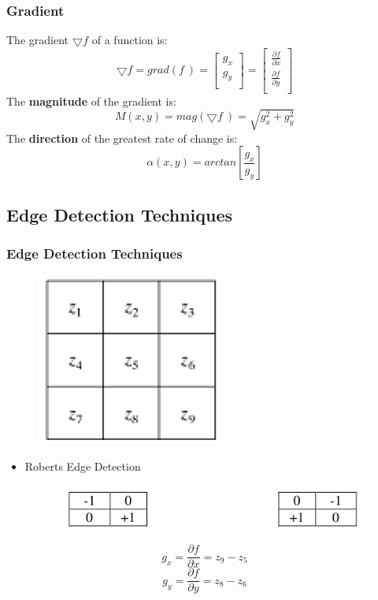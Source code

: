\documentclass[notheorems,serif,table,compress]{beamer}  %
\begin{document}
\begin{frame}
\frametitle{Gradient}
The gradient $\bigtriangledown f$ of a function is: 
    \begin{displaymath}
        \bigtriangledown f = grad(f ~) = \left[\begin{array}{c}
    		          g_{x}  \\
    		          g_{y}  \\
    		         \end{array}\right]
        =\left[ \begin{array}{c}
    		          \frac{\partial f}{\partial x}  \\
    		          \frac{\partial f}{\partial y}  \\
    		         \end{array} \right]
    \end{displaymath}
The {\textbf{magnitude}} of the gradient is:
    \begin{displaymath}
        M(x,y)=mag(\bigtriangledown f ~) = \sqrt{g_{x}^{2}+g_{y}^{2}}
    \end{displaymath}
The {\textbf{direction}} of the greatest rate of change is:
    \begin{displaymath}
        \alpha (x,y)=arctan \left[ \frac{g_{x}}{g_{y}} \right]
    \end{displaymath}
\end{frame}


\subsection{Edge Detection Techniques}

\begin{frame}        
\frametitle{Edge Detection Techniques}
    \begin{figure}
    \includegraphics[width=0.2\linewidth]{mo.png} 
    \end{figure}
    \begin{itemize}
    \item Roberts Edge Detection
        \begin{figure}
        \includegraphics[width=0.8\linewidth]{roberts.png} 
        \end{figure}
    \end{itemize}
    \begin{displaymath}
    g_{x}= \frac{\partial f}{\partial x}=z_{9}-z_{5}
    \end{displaymath}
    \begin{displaymath}
    g_{y}= \frac{\partial f}{\partial y}=z_{8}-z_{6}
    \end{displaymath}
\end{frame}
\end{document}
